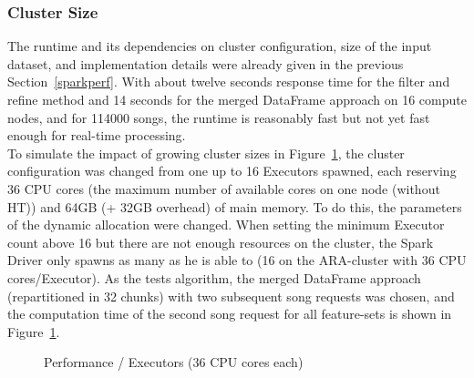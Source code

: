 \subsubsection{Cluster Size}

\noindent The runtime and its dependencies on cluster configuration, size of the input dataset, and implementation details were already given in the previous Section~\ref{sparkperf}. With about twelve seconds response time for the filter and refine method and 14 seconds for the merged DataFrame approach on 16 compute nodes, and for 114000 songs, the runtime is reasonably fast but not yet fast enough for real-time processing.\\ 
\noindent To simulate the impact of growing cluster sizes in Figure~\ref{perfspark6}, the cluster configuration was changed from one up to 16 Executors spawned, each reserving 36 CPU cores (the maximum number of available cores on one node (without HT)) and 64GB (+ 32GB overhead) of main memory. To do this, the parameters of the dynamic allocation were changed. When setting the minimum Executor count above 16 but there are not enough resources on the cluster, the Spark Driver only spawns as many as he is able to (16 on the ARA-cluster with 36 CPU cores/Executor). As the tests algorithm, the merged DataFrame approach (repartitioned in 32 chunks) with two subsequent song requests was chosen, and the computation time of the second song request for all feature-sets is shown in Figure~\ref{perfspark6}.\\

\FloatBarrier
\begin{figure}[htbp]
   	\centering
   	\caption{Performance / Executors (36 CPU cores each)}
   	\label{perfspark6}
\end{figure}
\FloatBarrier

